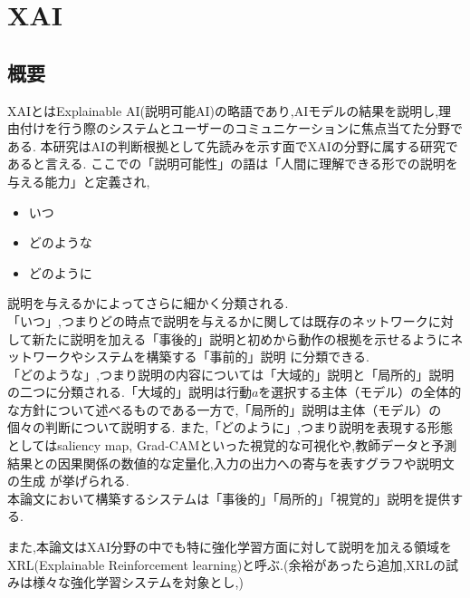\section{XAI}

\subsection{概要}
XAIとはExplainable AI(説明可能AI)の略語であり,AIモデルの結果を説明し,理由付けを行う際のシステムとユーザーのコミュニケーションに焦点当てた分野である\cite{consider}.
本研究はAIの判断根拠として先読みを示す面でXAIの分野に属する研究であると言える.
ここでの「説明可能性」の語は「人間に理解できる形での説明を与える能力」\cite{definition}と定義され,
\begin{itemize}
    \item いつ
    \item どのような
    \item どのように
\end{itemize}
説明を与えるかによってさらに細かく分類される.\\
「いつ」,つまりどの時点で説明を与えるかに関しては既存のネットワークに対して新たに説明を加える「事後的」説明と初めから動作の根拠を示せるようにネットワークやシステムを構築する「事前的」説明
に分類できる\cite{definition}.\\
「どのような」,つまり説明の内容については「大域的」説明と「局所的」説明の二つに分類される.「大域的」説明は行動$a$を選択する主体（モデル）の全体的な方針について述べるものである一方で,「局所的」説明は主体（モデル）の個々の判断について説明する\cite{gl}.
また,「どのように」,つまり説明を表現する形態としてはsaliency map\cite{saliency}, Grad-CAM\cite{Grad-CAM}といった視覚的な可視化や,教師データと予測結果との因果関係の数値的な定量化\cite{定量},入力の出力への寄与を表すグラフや説明文の生成\cite{LIME}
が挙げられる.\\
本論文において構築するシステムは「事後的」「局所的」「視覚的」説明を提供する.

また,本論文はXAI分野の中でも特に強化学習方面に対して説明を加える領域をXRL(Explainable Reinforcement learning)と呼ぶ.(余裕があったら追加,XRLの試みは様々な強化学習システムを対象とし,)
